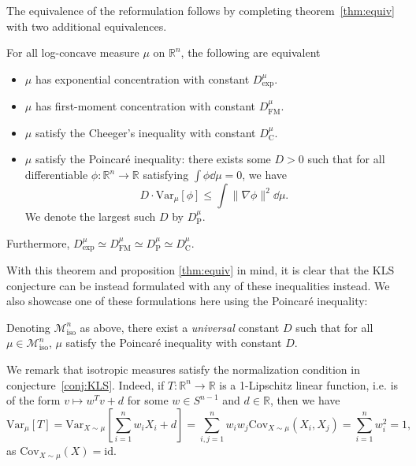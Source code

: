 The equivalence of the reformulation follows by completing theorem~\ref{thm:equiv} with two additional 
equivalences.

\begin{theorem}\label{thm:milman2}
  For all log-concave measure \(\mu\) on \(\mathbb{R}^n\), the following are equivalent
  \begin{itemize}
    \item \(\mu\) has exponential concentration with constant \(D^\mu_\text{exp}\).
    \item \(\mu\) has first-moment concentration with constant \(D^\mu_\text{FM}\).
    \item \(\mu\) satisfy the Cheeger's inequality with constant \(D^\mu_\text{C}\).
    \item \(\mu\) satisfy the Poincaré inequality: there exists some \(D > 0\) such that for all 
      differentiable \(\phi : \mathbb{R}^n \to \mathbb{R}\) satisfying \(\int \phi \dd\mu = 0\), we have
      \[D \cdot \text{Var}_\mu[\phi] \le \int \|\nabla \phi\|^2 \dd\mu.\]
      We denote the largest such \(D\) by \(D^\mu_{\text{P}}\).
  \end{itemize}
  Furthermore, \(D^\mu_{\text{exp}} \simeq D^\mu_{\text{FM}} \simeq D^\mu_{\text{P}} \simeq D^\mu_{\text{C}}\).
\end{theorem}

With this theorem and proposition \ref{thm:equiv} in mind, it is clear that the KLS conjecture can be 
instead formulated with any of these inequalities instead. We also showcase one of these formulations here 
using the Poincaré inequality:

\begin{conjecture}
  Denoting \(\mathscr{M}^n_{\text{iso}}\) as above, there exist a \textit{universal} constant \(D\) 
  such that for all \(\mu \in \mathscr{M}^n_{\text{iso}}\), \(\mu\) satisfy the Poincaré inequality 
  with constant \(D\).
\end{conjecture}

We remark that isotropic measures satisfy the normalization condition in conjecture~\ref{conj:KLS}. Indeed, if 
\(T : \mathbb{R}^n \to \mathbb{R}\) is a 1-Lipschitz linear function, i.e. is of the form \(v \mapsto w^T v + d\) 
for some \(w \in S^{n - 1}\) and \(d \in \mathbb{R}\), then we have
\[\text{Var}_{\mu}[T] = \text{Var}_{X \sim \mu}\left[\sum_{i = 1}^n w_i X_i + d\right] 
    = \sum_{i, j = 1}^n w_i w_j \text{Cov}_{X \sim \mu}(X_i, X_j) = \sum_{i = 1}^n w_i^2 = 1,\]
as \(\text{Cov}_{X \sim \mu}(X) = \text{id}\).

